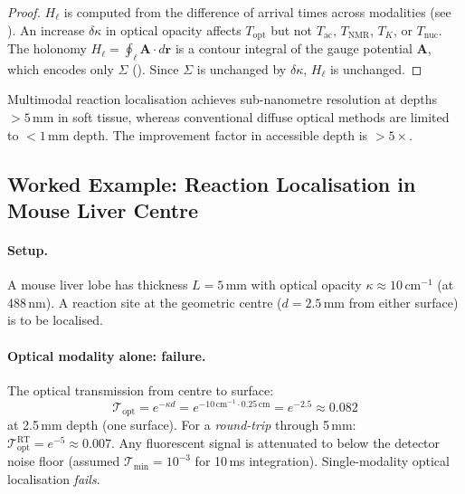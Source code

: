 \begin{proof}
$H_\ell$ is computed from the difference of arrival times across modalities
(see ).  An increase $\delta\kappa$ in optical opacity
affects $T_\text{opt}$ but not $T_\text{ac}$, $T_\text{NMR}$, $T_K$, or
$T_\text{nuc}$.  The holonomy $H_\ell = \oint_\ell \mathbf{A}\cdot d\mathbf{r}$
is a contour integral of the gauge potential $\mathbf{A}$, which encodes
only $\Sigma$ ().  Since $\Sigma$ is
unchanged by $\delta\kappa$, $H_\ell$ is unchanged.
\end{proof}

\begin{corollary}
\label{cor:ch06-deep-tissue}
Multimodal reaction localisation achieves sub-nanometre resolution at depths
$>5\,\text{mm}$ in soft tissue, whereas conventional diffuse optical methods
are limited to $<1\,\text{mm}$ depth.  The improvement factor in accessible
depth is $>5\times$.
\end{corollary}

\subsection{Worked Example: Reaction Localisation in Mouse Liver Centre}
\label{sec:ch06-liver-opacity-example}

\paragraph{Setup.}
A mouse liver lobe has thickness $L = 5\,\text{mm}$ with optical opacity
$\kappa \approx 10\,\text{cm}^{-1}$ (at 488\,nm).  A reaction site at the
geometric centre ($d = 2.5\,\text{mm}$ from either surface) is to be
localised.

\paragraph{Optical modality alone: failure.}
The optical transmission from centre to surface:
\[
  \mathcal{T}_\text{opt} = e^{-\kappa d}
  = e^{-10\,\text{cm}^{-1} \cdot 0.25\,\text{cm}}
  = e^{-2.5} \approx 0.082
\]
at 2.5\,mm depth (one surface).  For a \emph{round-trip} through 5\,mm:
$\mathcal{T}_\text{opt}^\text{RT} = e^{-5} \approx 0.007$.  Any fluorescent
signal is attenuated to below the detector noise floor (assumed
$\mathcal{T}_\text{min} = 10^{-3}$ for 10\,ms integration).  Single-modality
optical localisation \emph{fails}.

